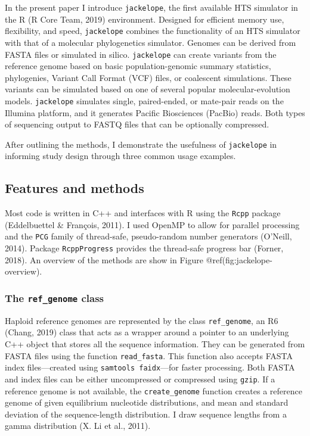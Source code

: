 \documentclass[12pt,]{article}
\begin{document}
In the present paper I introduce \texttt{jackelope}, the first available
HTS simulator in the R (R Core Team, 2019) environment. Designed for
efficient memory use, flexibility, and speed, \texttt{jackelope}
combines the functionality of an HTS simulator with that of a molecular
phylogenetics simulator. Genomes can be derived from FASTA files or
simulated in silico. \texttt{jackelope} can create variants from the
reference genome based on basic population-genomic summary statistics,
phylogenies, Variant Call Format (VCF) files, or coalescent simulations.
These variants can be simulated based on one of several popular
molecular-evolution models. \texttt{jackelope} simulates single,
paired-ended, or mate-pair reads on the Illumina platform, and it
generates Pacific Biosciences (PacBio) reads. Both types of sequencing
output to FASTQ files that can be optionally compressed.

After outlining the methods, I demonstrate the usefulness of
\texttt{jackelope} in informing study design through three common usage
examples.

\hypertarget{features-and-methods}{%
\subsection{Features and methods}\label{features-and-methods}}

Most code is written in C++ and interfaces with R using the
\texttt{Rcpp} package (Eddelbuettel \& François, 2011). I used OpenMP to
allow for parallel processing and the \texttt{PCG} family of
thread-safe, pseudo-random number generators (O'Neill, 2014). Package
\texttt{RcppProgress} provides the thread-safe progress bar (Forner,
2018). An overview of the methods are show in Figure
@ref(fig:jackelope-overview).

\hypertarget{the-ref_genome-class}{%
\subsubsection{\texorpdfstring{The \texttt{ref\_genome}
class}{The ref\_genome class}}\label{the-ref_genome-class}}

Haploid reference genomes are represented by the class
\texttt{ref\_genome}, an R6 (Chang, 2019) class that acts as a wrapper
around a pointer to an underlying C++ object that stores all the
sequence information. They can be generated from FASTA files using the
function \texttt{read\_fasta}. This function also accepts FASTA index
files---created using \texttt{samtools\ faidx}---for faster processing.
Both FASTA and index files can be either uncompressed or compressed
using \texttt{gzip}. If a reference genome is not available, the
\texttt{create\_genome} function creates a reference genome of given
equilibrium nucleotide distributions, and mean and standard deviation of
the sequence-length distribution. I draw sequence lengths from a gamma
distribution (X. Li et al., 2011).
\end{document}
